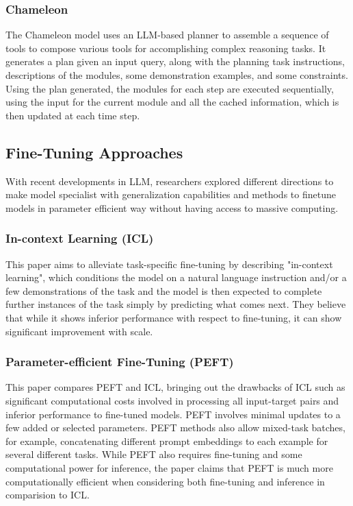 \documentclass[10pt,twocolumn,letterpaper]{article}
\begin{document}
\subsubsection{Chameleon\cite{lu2023chameleon} }The Chameleon model uses an LLM-based planner to assemble a sequence of tools to compose various tools for accomplishing complex reasoning tasks. It generates a plan given an input query, along with the planning task instructions, descriptions of the modules, some demonstration examples, and some constraints. Using the plan generated, the modules for each step are executed sequentially, using the input for the current module and all the cached information, which is then updated at each time step.
\subsection{Fine-Tuning Approaches}
With recent developments in LLM, researchers explored different directions to make model specialist with generalization capabilities and methods to finetune models in parameter efficient way without having access to massive computing.
\subsubsection{In-context Learning (ICL) \cite{brown2020language}} This paper aims to alleviate task-specific fine-tuning by describing "in-context learning", which conditions the model on a natural language instruction and/or a few demonstrations of the task and the model is then expected to complete further instances of the task simply by predicting what comes next. They believe that while it shows inferior performance with respect to fine-tuning, it can show significant improvement with scale.
\subsubsection{Parameter-efficient Fine-Tuning (PEFT)\cite{liu2022fewshot}}
This paper compares PEFT and ICL, bringing out the drawbacks of ICL such as significant computational costs involved in processing all input-target pairs and inferior performance to fine-tuned models. PEFT involves minimal updates to a few added or selected parameters. PEFT methods also allow mixed-task batches, for example, concatenating different prompt embeddings to each example for several different tasks. While PEFT also requires fine-tuning and some computational power for inference, the paper claims that PEFT is much more computationally efficient when considering both fine-tuning and inference in comparision to ICL.
\end{document}
